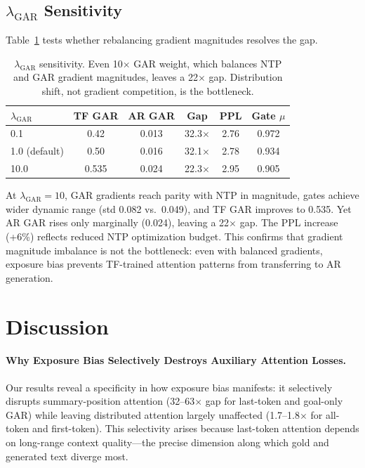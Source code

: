 \documentclass[11pt,a4paper]{article}
\begin{document}
\subsection{$\lambda_{\text{GAR}}$ Sensitivity}

Table~\ref{tab:lambda} tests whether rebalancing gradient magnitudes resolves the gap.

\begin{table}[t]
\centering
\small
\caption{$\lambda_{\text{GAR}}$ sensitivity. Even 10$\times$ GAR weight, which balances NTP and GAR gradient magnitudes, leaves a 22$\times$ gap. Distribution shift, not gradient competition, is the bottleneck.}
\label{tab:lambda}
\begin{tabular}{@{}lccccc@{}}
\toprule
$\lambda_{\text{GAR}}$ & TF GAR & AR GAR & Gap & PPL & Gate $\mu$ \\
\midrule
0.1 & 0.42 & 0.013 & 32.3$\times$ & 2.76 & 0.972 \\
1.0 (default) & 0.50 & 0.016 & 32.1$\times$ & 2.78 & 0.934 \\
10.0 & 0.535 & 0.024 & 22.3$\times$ & 2.95 & 0.905 \\
\bottomrule
\end{tabular}
\end{table}

At $\lambda_{\text{GAR}}{=}10$, GAR gradients reach parity with NTP in magnitude, gates achieve wider dynamic range (std 0.082 vs.\ 0.049), and TF GAR improves to 0.535. Yet AR GAR rises only marginally (0.024), leaving a 22$\times$ gap. The PPL increase (+6\%) reflects reduced NTP optimization budget. This confirms that gradient magnitude imbalance is not the bottleneck: even with balanced gradients, exposure bias prevents TF-trained attention patterns from transferring to AR generation.

\section{Discussion}

\paragraph{Why Exposure Bias Selectively Destroys Auxiliary Attention Losses.}
Our results reveal a specificity in how exposure bias manifests: it selectively disrupts summary-position attention (32--63$\times$ gap for last-token and goal-only GAR) while leaving distributed attention largely unaffected (1.7--1.8$\times$ for all-token and first-token). This selectivity arises because last-token attention depends on long-range context quality---the precise dimension along which gold and generated text diverge most.
\end{document}
